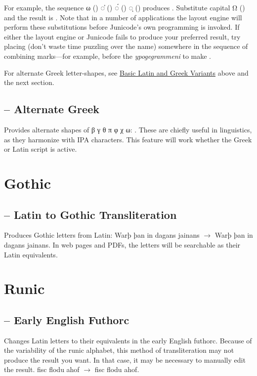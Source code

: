 For example, the sequence ω () ◌̓ () ◌́ () ◌ͅ ()
produces .
Substitute capital Ω () and the result is
. Note that in a number of applications the layout
engine will perform these substitutions before Junicode’s own programming is
invoked. If either the layout engine or Junicode fails to produce your
preferred result, try placing  
(don't waste time puzzling over the name) somewhere
in the sequence of combining marks—for example, before the \textit{ypogegrammeni}
to make .

For alternate Greek letter-shapes, see \hyperlink{LatGrkVariants}{Basic Latin and Greek Variants} above
and the next section.

\subsection{ – Alternate Greek}
Provides alternate shapes of {β γ θ π φ χ ω}:
.
These are chiefly useful in linguistics, as they harmonize with IPA characters. This feature
will work whether the Greek or Latin script is active.

\section{Gothic}
\subsection{ – Latin to Gothic Transliteration}
Produces Gothic letters from Latin: {Warþ þan in dagans jainans} $\rightarrow $
{\LatinToGothic{}Warþ þan in dagans
jainans}. In web pages and PDFs, the letters will be searchable as their Latin equivalents.

\section{Runic}
\subsection{ – Early English Futhorc}
Changes Latin letters to their equivalents in the early English futhorc. Because of the variability of the runic
alphabet, this method of transliteration may not produce the result you want. In that case, it may be necessary to
manually edit the result. fisc flodu ahof $\rightarrow $ {fisc flodu ahof}.

